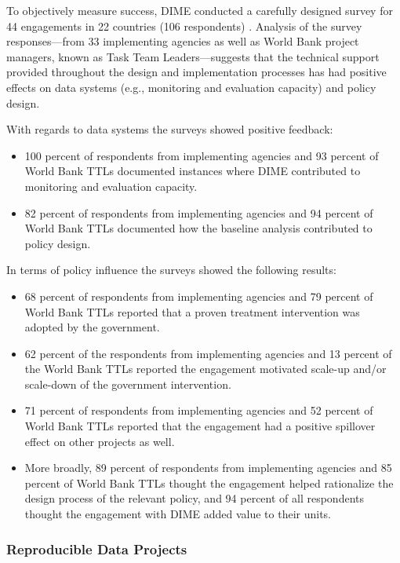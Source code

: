 To objectively measure success, DIME conducted a carefully designed survey for 44 engagements in 22 countries (106 respondents) \citep{legovini}. Analysis of the survey responses---from 33 implementing agencies as well as World Bank project managers, known as Task Team Leaders---suggests that the technical support provided throughout the design and implementation processes has had positive effects on data systems (e.g., monitoring and evaluation capacity) and policy design.

With regards to data systems the surveys showed positive feedback:

\begin{itemize}
\tightlist
\item
  100 percent of respondents from implementing agencies and 93 percent of World Bank TTLs documented instances where DIME contributed to monitoring and evaluation capacity.
\item
  82 percent of respondents from implementing agencies and 94 percent of World Bank TTLs documented how the baseline analysis contributed to policy design.
\end{itemize}

In terms of policy influence the surveys showed the following results:

\begin{itemize}
\tightlist
\item
  68 percent of respondents from implementing agencies and 79 percent of World Bank TTLs reported that a proven treatment intervention was adopted by the government.
\item
  62 percent of the respondents from implementing agencies and 13 percent of the World Bank TTLs reported the engagement motivated scale-up and/or scale-down of the government intervention.
\item
  71 percent of respondents from implementing agencies and 52 percent of World Bank TTLs reported that the engagement had a positive spillover effect on other projects as well.
\item
  More broadly, 89 percent of respondents from implementing agencies and 85 percent of World Bank TTLs thought the engagement helped rationalize the design process of the relevant policy, and 94 percent of all respondents thought the engagement with DIME added value to their units.
\end{itemize}

\hypertarget{reproducible-data-projects}{%
\subsubsection*{Reproducible Data Projects}\label{reproducible-data-projects}}

